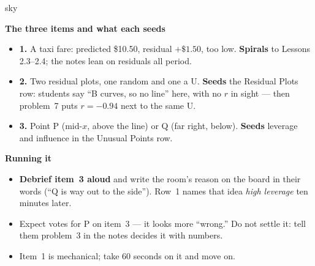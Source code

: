 \documentclass[10pt]{article}
\begin{document}
\boxguard[20]
\begin{skillbox}{sky}
\begin{minipage}[t]{0.48\linewidth}
    \textbf{The three items and what each seeds}
    \begin{itemize}
        \item \textbf{1.} A taxi fare: predicted \$10.50, residual $+\$1.50$, too low.
              \textbf{Spirals} to Lessons 2.3--2.4; the notes lean on residuals all period.
        \item \textbf{2.} Two residual plots, one random and one a U. \textbf{Seeds} the
              Residual Plots row: students say ``B curves, so no line'' here, with no $r$ in
              sight --- then problem~7 puts $r = -0.94$ next to the same U.
        \item \textbf{3.} Point P (mid-$x$, above the line) or Q (far right, below). \textbf{Seeds}
              leverage and influence in the Unusual Points row.
    \end{itemize}
\end{minipage}
\hfill
\begin{minipage}[t]{0.48\linewidth}
    \textbf{Running it}
    \begin{itemize}
        \item \textbf{Debrief item~3 aloud} and write the room's reason on the board in their
              words (``Q is way out to the side''). Row~1 names that idea \emph{high leverage}
              ten minutes later.
        \item Expect votes for P on item~3 --- it looks more ``wrong.'' Do not settle it: tell
              them problem~3 in the notes decides it with numbers.
        \item Item~1 is mechanical; take 60 seconds on it and move on.
    \end{itemize}
\end{minipage}
\end{skillbox}
\end{document}
